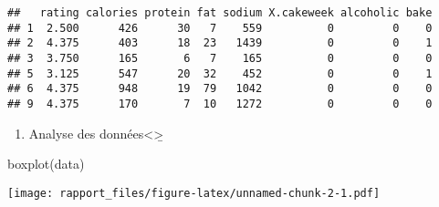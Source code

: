 \documentclass[
]{article}
\newenvironment{Shaded}{\begin{snugshade}}{\end{snugshade}}
\newcommand{\FunctionTok}[1]{\textcolor[rgb]{0.00,0.00,0.00}{#1}}
\newcommand{\NormalTok}[1]{#1}
\providecommand{\tightlist}{%
  \setlength{\itemsep}{0pt}\setlength{\parskip}{0pt}}
\begin{document}
\begin{verbatim}
##   rating calories protein fat sodium X.cakeweek alcoholic bake
## 1  2.500      426      30   7    559          0         0    0
## 2  4.375      403      18  23   1439          0         0    1
## 3  3.750      165       6   7    165          0         0    0
## 5  3.125      547      20  32    452          0         0    1
## 6  4.375      948      19  79   1042          0         0    0
## 9  4.375      170       7  10   1272          0         0    0
\end{verbatim}

\begin{enumerate}
\def\labelenumi{\arabic{enumi})}
\tightlist
\item
  Analyse des données\textless{}\b>
\end{enumerate}

\begin{Shaded}
\begin{Highlighting}[]
\FunctionTok{boxplot}\NormalTok{(data)}
\end{Highlighting}
\end{Shaded}

\texttt{[image: rapport\_files/figure-latex/unnamed-chunk-2-1.pdf]}
\end{document}
